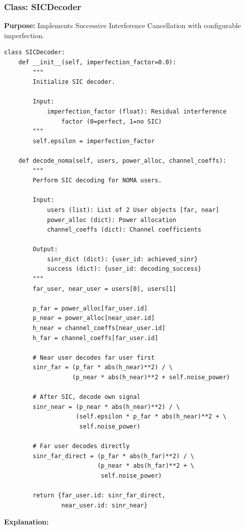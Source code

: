 \documentclass[12pt,a4paper]{article}
\begin{document}
\subsubsection{Class: SICDecoder}

\textbf{Purpose:} Implements Successive Interference Cancellation with configurable imperfection.

\begin{verbatim}
class SICDecoder:
    def __init__(self, imperfection_factor=0.0):
        """
        Initialize SIC decoder.
        
        Input:
            imperfection_factor (float): Residual interference 
                factor (0=perfect, 1=no SIC)
        """
        self.epsilon = imperfection_factor
    
    def decode_noma(self, users, power_alloc, channel_coeffs):
        """
        Perform SIC decoding for NOMA users.
        
        Input:
            users (list): List of 2 User objects [far, near]
            power_alloc (dict): Power allocation
            channel_coeffs (dict): Channel coefficients
        
        Output:
            sinr_dict (dict): {user_id: achieved_sinr}
            success (dict): {user_id: decoding_success}
        """
        far_user, near_user = users[0], users[1]
        
        p_far = power_alloc[far_user.id]
        p_near = power_alloc[near_user.id]
        h_near = channel_coeffs[near_user.id]
        h_far = channel_coeffs[far_user.id]
        
        # Near user decodes far user first
        sinr_far = (p_far * abs(h_near)**2) / \
                   (p_near * abs(h_near)**2 + self.noise_power)
        
        # After SIC, decode own signal
        sinr_near = (p_near * abs(h_near)**2) / \
                    (self.epsilon * p_far * abs(h_near)**2 + \
                     self.noise_power)
        
        # Far user decodes directly
        sinr_far_direct = (p_far * abs(h_far)**2) / \
                          (p_near * abs(h_far)**2 + \
                           self.noise_power)
        
        return {far_user.id: sinr_far_direct, 
                near_user.id: sinr_near}
\end{verbatim}

\textbf{Explanation:}
\end{document}
